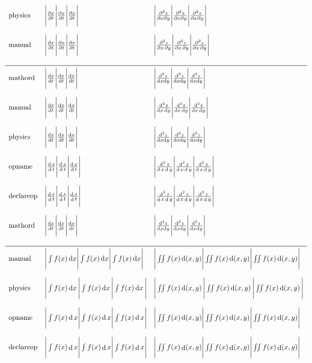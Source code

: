 \documentclass{unittest}
\newcommand{\ddalt}{\mathop{}\!\mathrm{d}}
\newcommand{\ddord}{\mathord{\mathrm{d}}}
\newcommand{\ddop}{\operatorname{d}}
\newcommand{\pp}{\mathop{}\!\partial}
\DeclareMathOperator*{\ddOP}{d}
\def\repeat#1{\Bigg|#1\Bigg|#1\Bigg|#1\Bigg|}
\begin{document}
$\begin{array}{llll}
\text{physics}   & \repeat{\pdv{x}{t}}       & \repeat{\pdv{z}{x}{y}}        \\\\
\text{manual}    & \repeat{\frac{\pp{x}}{\pp{t}}} & \repeat{\frac{\pp^2{z}}{\pp{x}\pp{y}}}  \\\\
\midrule
\text{mathord}   & \repeat{\frac{\ddord{x}}{\ddord{t}}} & \repeat{\frac{\ddord^2{z}}{\ddord{x}\ddord{y}}}  \\\\
\text{manual}    & \repeat{\frac{\ddalt{x}}{\ddalt{t}}} & \repeat{\frac{\ddalt^2{z}}{\ddalt{x}\ddalt{y}}}  \\\\
\text{physics}   & \repeat{\frac{\dd{x}}{\dd{t}}}       & \repeat{\frac{\dd^2{z}}{\dd{x}\dd{y}}}        \\\\
\text{opname}    & \repeat{\frac{\ddop{x}}{\ddop{t}}}   & \repeat{\frac{\ddop^2{z}}{\ddop{x}\ddop{y}}}    \\\\
\text{declareop} & \repeat{\frac{\ddOP{x}}{\ddOP{t}}}   & \repeat{\frac{\ddOP^2{z}}{\ddOP{x}\ddOP{y}}}    \\\\
\text{mathord}   & \repeat{\frac{\ddord{x}}{\ddord{t}}} & \repeat{\frac{\ddord^2{z}}{\ddord{x}\ddord{y}}}  \\\\
\midrule
\text{manual}    & \repeat{\int f(x)\ddalt{x}} & \repeat{\iint f(x)\ddalt(x,y)} \\\\
\text{physics}   & \repeat{\int f(x)\dd{x}}    & \repeat{\iint f(x)\dd(x,y)} \\\\
\text{opname}    & \repeat{\int f(x)\ddop{x}}  & \repeat{\iint f(x)\ddop(x,y)} \\\\
\text{declareop} & \repeat{\int f(x)\ddOP{x}}  & \repeat{\iint f(x)\ddOP(x,y)} \\\\
\end{array}$
\end{document}
